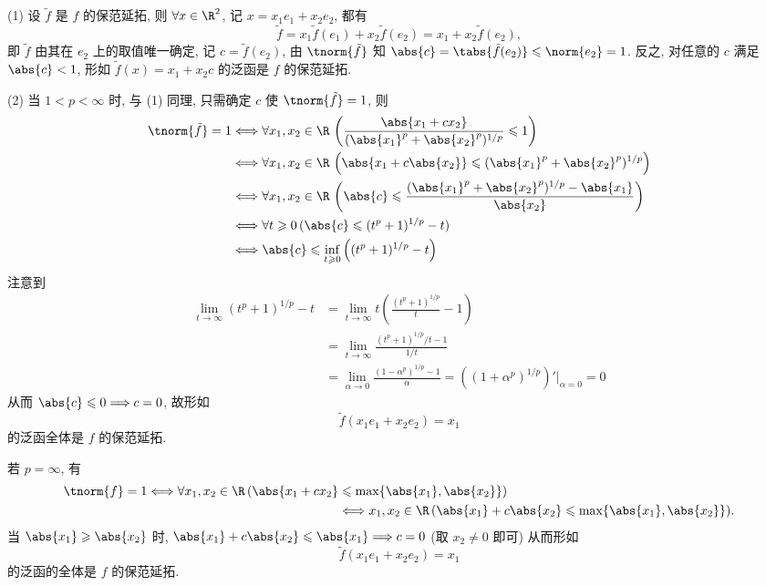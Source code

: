 	\begin{answer}
		(1) 设 $ \tilde{f} $ 是 $ f $ 的保范延拓, 则 $ \forall x\in\R^{2} $, 记 $ x=x_{1}e_{1}+x_{2}e_{2} $, 都有
		\[
			\tilde{f} = x_{1}\tilde{f}(e_{1})+x_{2}\tilde{f}(e_{2})=x_{1}+x_{2}\tilde{f}(e_{2}),
		\]
		即 $ \tilde{f} $ 由其在 $ e_{2} $ 上的取值唯一确定, 记 $ c=\tilde{f}(e_{2}) $, 由 $ \tnorm{\tilde{f}} $ 知 $ \abs{c}=\tabs{\tilde{f}(e_{2})}\leqslant\norm{e_{2}}=1 $. 反之, 对任意的 $ c $ 满足 $ \abs{c}<1 $, 形如 $ \tilde{f}(x)=x_{1}+x_{2}c $ 的泛函是 $ f $ 的保范延拓.

		(2) 当 $ 1<p<\infty $ 时, 与 (1) 同理, 只需确定 $ c $ 使 $ \tnorm{\tilde{f}}=1 $, 则
		\[
			\begin{aligned}
				\tnorm{\tilde{f}}=1 & \Longleftrightarrow \forall x_{1}, x_{2}\in\R\,\left( \frac{\abs{x_{1}+cx_{2}}}{(\abs{x_{1}}^{p}+\abs{x_{2}}^{p})^{1/p}}\leqslant1 \right)\\
				& \Longleftrightarrow\forall x_{1}, x_{2}\in\R\,\left(\abs{x_{1}+c\abs{x_{2}}}\leqslant(\abs{x_{1}}^{p}+\abs{x_{2}}^{p})^{1/p} \right)\\
				& \Longleftrightarrow \forall x_{1}, x_{2}\in\R\,\left( \abs{c}\leqslant\frac{(\abs{x_{1}}^{p}+\abs{x_{2}}^{p})^{1/p}-\abs{x_{1}}}{\abs{x_{2}}} \right)\\
				& \Longleftrightarrow \forall t\geqslant0\,(\abs{c}\leqslant(t^{p}+1)^{1/p}-t)\\
				&\Longleftrightarrow \abs{c}\leqslant\inf_{t\geqslant0}\left( (t^{p}+1)^{1/p}-t \right)
			\end{aligned}
		\]
		注意到
		\[
			\begin{aligned}
				\lim_{t\to\infty}(t^{p}+1)^{1/p}-t & =\lim_{t\to\infty}t\left( \frac{(t^{p}+1)^{1/p}}{t}-1 \right)\\
				& = \lim_{t\to\infty}\frac{(t^{p}+1)^{1/p}/t-1}{1/t}\\
				& = \lim_{\alpha\to0}\frac{(1-\alpha^{p})^{1/p}-1}{\alpha}=\left( (1+\alpha^{p})^{1/p} \right)'\Big|_{\alpha=0}=0
			\end{aligned}
		\]
		从而 $ \abs{c}\leqslant0\Longrightarrow c=0 $, 故形如 
		\[
			\tilde{f}(x_{1}e_{1}+x_{2}e_{2})=x_{1}
		\]
		的泛函全体是 $ f $ 的保范延拓.

		若 $ p=\infty $, 有
		\[
			\begin{aligned}
				\tnorm{f}=1\Longleftrightarrow \forall x_{1}, x_{2}\in\R\,(\abs{x_{1}+cx_{2}}& \leqslant\max\{ \abs{x_{1}}, \abs{x_{2}} \})\\
				& \Longleftrightarrow x_{1}, x_{2}\in\R\,(\abs{x_{1}}+c\abs{x_{2}}\leqslant\max\{ \abs{x_{1}}, \abs{x_{2}} \}).
			\end{aligned}	
		\]
		当 $ \abs{x_{1}}\geqslant\abs{x_{2}} $ 时, $ \abs{x_{1}}+c\abs{x_{2}}\leqslant\abs{x_{1}}\Longrightarrow c=0 $ (取 $ x_{2}\ne 0 $ 即可) 从而形如
		\[
			\tilde{f}(x_{1}e_{1}+x_{2}e_{2})=x_{1}
		\]
		的泛函的全体是 $ f $ 的保范延拓.\qedhere
	\end{answer}


